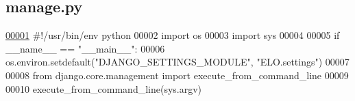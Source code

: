 \hypertarget{manage_8py_source}{}\subsection{manage.\+py}
\label{manage_8py_source}

\begin{DoxyCode}
\hypertarget{manage_8py_source_l00001}{}\hyperlink{namespacemanage}{00001} \textcolor{comment}{#!/usr/bin/env python}
00002 \textcolor{keyword}{import} os
00003 \textcolor{keyword}{import} sys
00004 
00005 \textcolor{keywordflow}{if} \_\_name\_\_ == \textcolor{stringliteral}{"\_\_main\_\_"}:
00006     os.environ.setdefault(\textcolor{stringliteral}{"DJANGO\_SETTINGS\_MODULE"}, \textcolor{stringliteral}{"ELO.settings"})
00007 
00008     \textcolor{keyword}{from} django.core.management \textcolor{keyword}{import} execute\_from\_command\_line
00009 
00010     execute\_from\_command\_line(sys.argv)
\end{DoxyCode}
